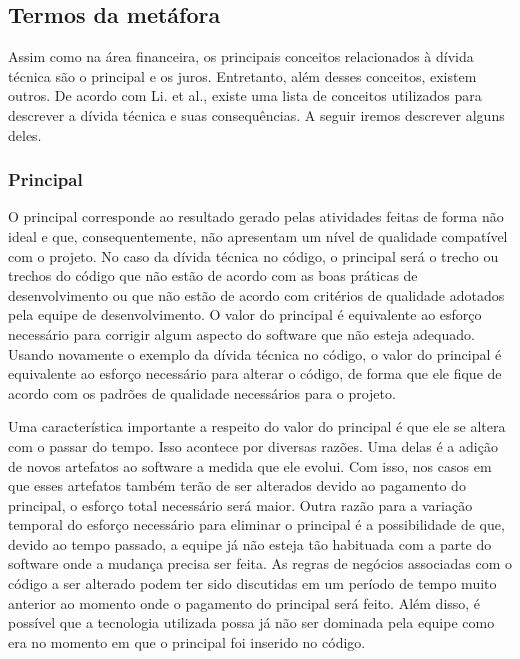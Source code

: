 \subsection{Termos da metáfora}
\label{elementos_td}

Assim como na área financeira, os principais conceitos relacionados à dívida técnica são o principal e os juros. Entretanto, além desses conceitos, existem outros. De acordo com Li. et al.\cite{li2015systematic}, existe uma lista de conceitos utilizados para descrever a dívida técnica e suas consequências. A seguir iremos descrever alguns deles.


\subsubsection{Principal}
O principal corresponde ao resultado gerado pelas atividades feitas de forma não ideal e que, consequentemente, não apresentam um nível de qualidade compatível com o projeto. No caso da dívida técnica no código, o principal será o trecho ou trechos do código que não estão de acordo com as boas práticas de desenvolvimento ou que não estão de acordo com critérios de qualidade adotados pela equipe de desenvolvimento. O valor do principal é equivalente ao esforço necessário para corrigir algum aspecto do software que não esteja adequado. Usando novamente o exemplo da dívida técnica no código, o valor do principal é equivalente ao esforço necessário para alterar o código, de forma que ele fique de acordo com os padrões de qualidade necessários para o projeto.

Uma característica importante a respeito do valor do principal é que ele se altera com o passar do tempo. Isso acontece por diversas razões. Uma delas é a adição de novos artefatos ao software a medida que ele evolui. Com isso, nos casos em que esses artefatos também terão de ser alterados devido ao pagamento do principal, o esforço total necessário será maior. Outra razão para a variação temporal do esforço necessário para eliminar o principal é a possibilidade de que, devido ao tempo passado, a equipe já não esteja tão habituada com a parte do software onde a mudança precisa ser feita. As regras de negócios associadas com o código a ser alterado podem ter sido discutidas em um período de tempo muito anterior ao momento onde o pagamento do principal será feito. Além disso, é possível que a tecnologia utilizada possa já não ser dominada pela equipe como era no momento em que o principal foi inserido no código. 

